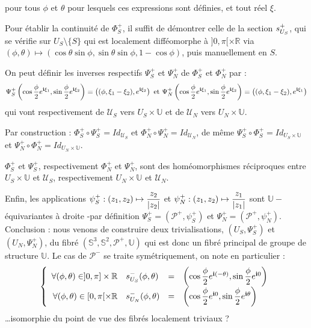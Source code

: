 pour tous $\phi$ et $\theta$ pour lesquels ces expressions sont d\'efinies, et tout r\'eel $\xi$.
\par
Pour \'etablir la continuit\'e de $\Phi_S^+$, il suffit de d\'emontrer celle de la section $s_{U_{S}}^{+}$, %
qui se v\'erifie sur $U_S\setminus\{S\}$ qui est localement diff\'eomorphe \`a $]0,\pi [\times\mathbb{R}$ via $(\phi,\theta )\mapsto\left(\cos\theta\sin\phi ,\sin\theta\sin\phi ,1-\cos\phi\right)$, %
puis \og{}manuellement\fg{} en $S$.
\par
On peut d\'efinir les inverses respectifs $\Psi_S^+$ et $\Psi_N^+$ de $\Phi_S^+$ et $\Phi_N^+$ par :
\[\Psi_S^+\left(\cos\dfrac{\phi}{2}e^{\mathbf{i}\xi_1},\sin\dfrac{\phi}{2}e^{\mathbf{i}\xi_2}\right)=\left((\phi,\xi_1-\xi_2),e^{\mathbf{i}\xi_2}\right)\text{ et }\Psi_N^+\left(\cos\dfrac{\phi}{2}e^{\mathbf{i}\xi_1},\sin\dfrac{\phi}{2}e^{\mathbf{i}\xi_2}\right)=\left((\phi,\xi_1-\xi_2),e^{\mathbf{i}\xi_1}\right)\]
qui vont respectivement de $\mathcal{U}_S$ vers $U_S\times\mathbb{U}$ et de $\mathcal{U}_N$ vers $U_N\times\mathbb{U}$.
\par
Par construction : $\Phi_S^+\circ\Psi_S^+=Id_{\mathcal{U}_S}$ et $\Phi_N^+\circ\Psi_N^+=Id_{\mathcal{U}_N}$, %
de m\^eme $\Psi_S^+\circ\Phi_S^+=Id_{U_S\times\mathbb{U}}$ et $\Psi_N^+\circ\Phi_N^+=Id_{U_N\times\mathbb{U}}$.
\par
$\Phi_S^+$ et $\Psi_S^+$, respectivement $\Phi_N^+$ et $\Psi_N^+$, sont des hom\'eomorphismes r\'eciproques %
entre $U_S\times\mathbb{U}$ et $\mathcal{U}_S$, respectivement $U_N\times\mathbb{U}$ et $\mathcal{U}_N$.
\par
Enfin, les applications $\psi_S^+:(z_1,z_2)\mapsto\dfrac{z_2}{\lvert z_2\rvert}$ et $\psi_N^+:(z_1,z_2)\mapsto\dfrac{z_1}{\lvert z_1\rvert}$ sont $\mathbb{U}-$\'equivariantes \`a droite %
-par d\'efinition $\Psi_S^+=(\mathcal{P}^+,\psi_S^+)$ et $\Psi_N^+=(\mathcal{P}^+,\psi_N^+)$.
\ligneinter
Conclusion : nous venons de construire deux trivialisations, $(U_S,\Psi_S^+)$ et $(U_N,\Psi_N^+)$, du fibr\'e $(\mathbb{S}^3,\mathbb{S}^2,\mathcal{P}^+,\mathbb{U})$ %
qui est donc un fibr\'e principal de groupe de structure $\mathbb{U}$.
\etoile
Le cas de $\mathcal{P}^-$ se traite sym\'etriquement, on note en particulier :
\[\left\{\begin{array}{rlcl}%
\forall (\phi,\theta)\in ]0,\pi]\times\mathbb{R}&\se{S}{-}(\phi ,\theta )&=&\st{\phi}{(-\theta )}{0}\\%
\forall (\phi,\theta)\in [0,\pi [\times\mathbb{R}&\se{N}{-}(\phi ,\theta )&=&\st{\phi}{0}{\theta}\\%
\end{array}\right.\]
\dots isomorphie du point de vue des fibr\'es localement triviaux ?

